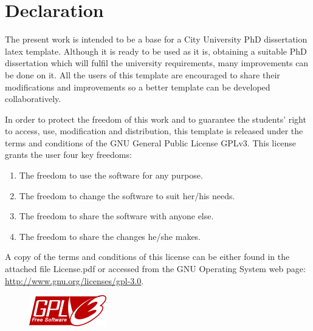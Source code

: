\chapter*{Declaration}

The present work is intended to be a base for a City University PhD dissertation latex template. Although it is ready to be used as it is, obtaining a suitable PhD dissertation which will fulfil the university requirements, many improvements can be done on it. All the users of this template are encouraged to share their modifications and improvements so a better template can be developed collaboratively. 

In order to protect the freedom of this work and to guarantee the students' right to access, use, modification and distribution, this template is released under the terms and conditions of the GNU General Public License GPLv3. This license grants the user four key freedoms: 

\begin{enumerate}[1]
    \item The freedom to use the software for any purpose.
    \item The freedom to change the software to suit her/his needs.
    \item The freedom to share the software with anyone else.
    \item The freedom to share the changes he/she makes.
\end{enumerate}

A copy of the terms and conditions of this license can be either found in the attached file License.pdf or accessed from the GNU Operating System web page: {\color{blue}\href{http://www.gnu.org/licenses/gpl-3.0}{http://www.gnu.org/licenses/gpl-3.0}}. 

\vspace{10mm}

\begin{figure}[htbp!]
    \centering
    \href{http://www.gnu.org/licenses/gpl-3.0.txt}{\includegraphics[width=0.20\linewidth]{Frontmatter/gplv3}}
\end{figure}




